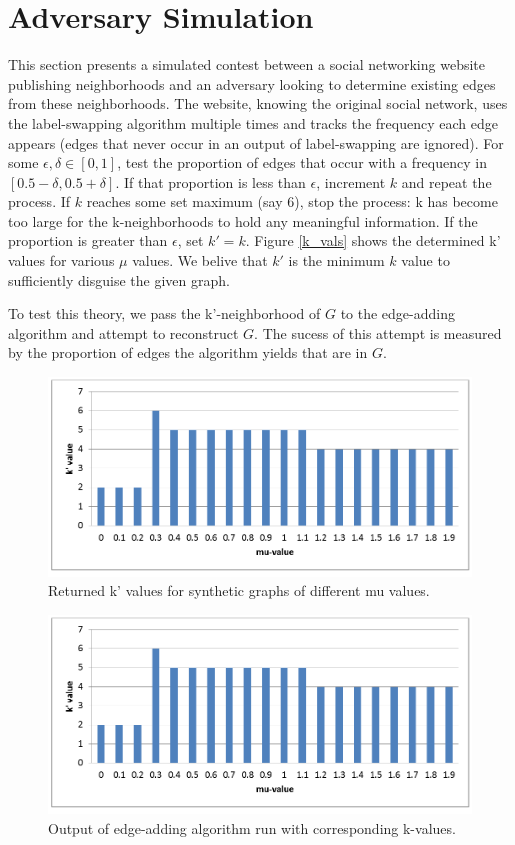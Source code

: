 \section{Adversary Simulation}

\noindent This section presents a simulated contest between a social networking website publishing neighborhoods and an adversary looking to determine existing edges from these neighborhoods. The website, knowing the original social network, uses the label-swapping algorithm multiple times and tracks the frequency each edge appears (edges that never occur in an output of label-swapping are ignored). For some $\epsilon,\delta \in [0,1]$, test the proportion of edges that occur with a frequency in $[0.5-\delta,0.5+\delta]$. If that proportion is less than $\epsilon$, increment $k$ and repeat the process. If $k$ reaches some set maximum (say 6), stop the process: k has become too large for the k-neighborhoods to hold any meaningful information. If the proportion is greater than $\epsilon$, set $k' = k$.  Figure \ref{k_vals} shows the determined k' values for various $\mu$ values. We belive that $k'$ is the minimum $k$ value to sufficiently disguise the given graph.

\indent To test this theory, we pass the k'-neighborhood of $G$ to the edge-adding algorithm and attempt to reconstruct $G$. The sucess of this attempt is measured by the proportion of edges the algorithm yields that are in $G$.

\begin{figure}[H]
  \label{k_vals}
  \centering
  \includegraphics[scale=0.4]{k'_value_synthetic.png}
  \caption{Returned k' values for synthetic graphs of different mu values.}
  \label{fig:k'_values}
\end{figure}

\begin{figure}[H]
  \label{profs_out}
  \centering
  \includegraphics[scale=0.4]{k'_value_synthetic.png}
  \caption{Output of edge-adding algorithm run with corresponding k-values.}
  \label{fig:prof_values}
\end{figure}
